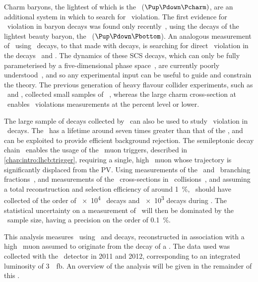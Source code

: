 
Charm baryons, the lightest of which is the \PLambdac~($\Pup\Pdown\Pcharm)$, 
are an additional system in which to search for \CP\ violation.
The first evidence for \CP\ violation in baryon decays was found only 
recently~\cite{Aaij:2016cla}, using the decays of the lightest beauty baryon, 
the \PLambdab~($\Pup\Pdown\Pbottom$).
An analogous measurement of \dACP\ using \PLambdac\ decays, to that made with 
\PDzero decays, is searching for direct \CP\ violation in the decays \LcTopKK\ 
and \LcToppipi.
The dynamics of these \ac{SCS} decays, which can only be fully parameterised by 
a five-dimensional phase space~\cite{Aitala:1999uq}, are currently poorly 
understood~\cite{Bigi:2012ev,PDG2014}, and so any experimental input can be 
useful to guide and constrain the theory.
The previous generation of heavy flavour collider experiments, such as \belle\ 
and \babar, collected small samples of \PLambdac~\cite{Seuster:2005tr}, whereas 
the large charm cross-section at \lhcb\ enables \CP\ violations measurements at 
the percent level or lower.

The large sample of \PB decays collected by \lhcb\ can also be used to study 
\CP\ violation in \PLambdac\ decays.
The \PLambdab\ has a lifetime around seven times greater than that of the 
\PLambdac, and can be exploited to provide efficient background rejection.
The semileptonic decay chain \LbToLcmuX\ enables the usage of the \lhcb\ muon 
triggers, described in \cref{chap:intro:lhcb:trigger}, requiring a single, high 
\pT\ muon whose trajectory is significantly displaced from the \ac{PV}.
Using measurements of the \LbToLcmuX\ and \LcTophh\ branching 
fractions~\cite{PDG2014,Ablikim:2016tze}, and measurements of the \PLambdab\ 
cross-sections in \pp\ collisions~\cite{Aaij:2015fea}, and assuming a total 
reconstruction and selection efficiency of around \SI{1}{\percent}, \lhcb\ 
should have collected of the order of \num{e4} \ppipi\ decays and \num{e3} \pKK 
decays during \runone.
The statistical uncertainty on a measurement of \dACP\ will then be dominated 
by the \pKK\ sample size, having a precision on the order of 
\SI{0.1}{\percent}.

This analysis measures \dACP\ using \LcTopKK\ and \LcToppipi decays, 
reconstructed in association with a high \pT\ muon assumed to originate from 
the decay of a \PLambdab.
The data used was collected with the \lhcb\ detector in 2011 and 2012, 
corresponding to an integrated luminosity of \SI{3}{\per\femto\barn}.
An overview of the analysis will be given in the remainder of this 
.

